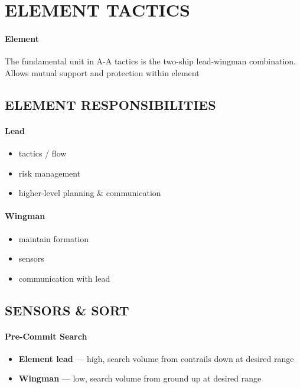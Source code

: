 \section{ELEMENT TACTICS}
\label{sec:ttp_aa:tactics_element}

\paragraph{Element}
The fundamental unit in A-A tactics is the two-ship lead-wingman combination.
Allows mutual support and protection within element

\subsection{ELEMENT RESPONSIBILITIES}

\paragraph{Lead}
\begin{itemize}
    \item tactics / flow
    \item risk management
    \item higher-level planning \& communication
\end{itemize}

\paragraph{Wingman}
\begin{itemize}
    \item maintain formation
    \item sensors
    \item communication with lead
\end{itemize}

\subsection{SENSORS \& SORT}

\paragraph{Pre-Commit Search}
\begin{itemize}
    \item \textbf{Element lead} --- high, search volume from contrails down at desired range
    \item \textbf{Wingman} --- low, search volume from ground up at desired range
\end{itemize}
